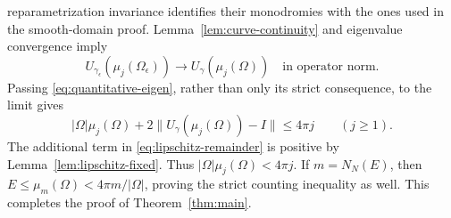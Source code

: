 \documentclass[11pt]{amsart}
\numberwithin{equation}{section}
\newcommand{\norm}[1]{\lVert #1\rVert}
\begin{document}
reparametrization invariance identifies their monodromies with the
ones used in the smooth-domain proof. Lemma~\ref{lem:curve-continuity}
and eigenvalue convergence imply
\[
 U_{\gamma_\epsilon}(\mu_j(\Omega_\epsilon))
       \longrightarrow U_\gamma(\mu_j(\Omega))
       \quad\text{in operator norm}.
\]
Passing \eqref{eq:quantitative-eigen}, rather than only its strict
consequence, to the limit gives
\begin{equation}\label{eq:lipschitz-remainder}
 |\Omega|\mu_j(\Omega)
    +2\norm{U_\gamma(\mu_j(\Omega))-I}\le4\pi j\qquad(j\ge1).
\end{equation}
The additional term in \eqref{eq:lipschitz-remainder} is positive
by Lemma~\ref{lem:lipschitz-fixed}.
Thus $|\Omega|\mu_j(\Omega)<4\pi j$. If $m=N_N(E)$, then
$E\le\mu_m(\Omega)<4\pi m/|\Omega|$, proving the strict counting
inequality as well. This completes the proof of Theorem~\ref{thm:main}.
\end{document}

